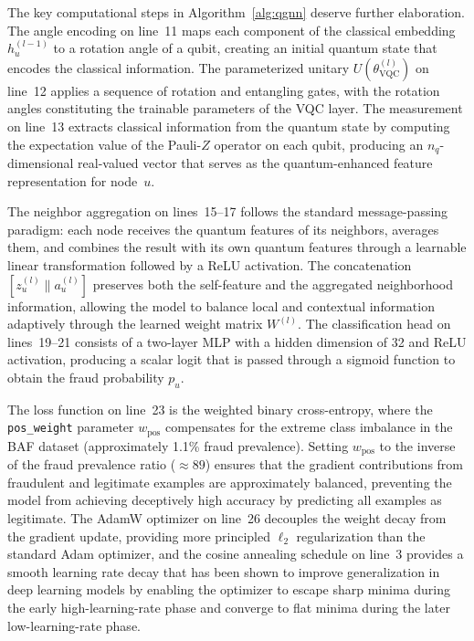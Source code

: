 The key computational steps in Algorithm~\ref{alg:qgnn} deserve further elaboration. The angle encoding on line~11 maps each component of the classical embedding $h_u^{(l-1)}$ to a rotation angle of a qubit, creating an initial quantum state that encodes the classical information. The parameterized unitary $U(\theta_{\text{VQC}}^{(l)})$ on line~12 applies a sequence of rotation and entangling gates, with the rotation angles constituting the trainable parameters of the VQC layer. The measurement on line~13 extracts classical information from the quantum state by computing the expectation value of the Pauli-$Z$ operator on each qubit, producing an $n_q$-dimensional real-valued vector that serves as the quantum-enhanced feature representation for node~$u$.

The neighbor aggregation on lines~15--17 follows the standard message-passing paradigm: each node receives the quantum features of its neighbors, averages them, and combines the result with its own quantum features through a learnable linear transformation followed by a ReLU activation. The concatenation $\left[z_u^{(l)} \| a_u^{(l)}\right]$ preserves both the self-feature and the aggregated neighborhood information, allowing the model to balance local and contextual information adaptively through the learned weight matrix $W^{(l)}$. The classification head on lines~19--21 consists of a two-layer MLP with a hidden dimension of 32 and ReLU activation, producing a scalar logit that is passed through a sigmoid function to obtain the fraud probability $p_u$.

The loss function on line~23 is the weighted binary cross-entropy, where the \texttt{pos\_weight} parameter $w_{\text{pos}}$ compensates for the extreme class imbalance in the BAF dataset (approximately 1.1\% fraud prevalence). Setting $w_{\text{pos}}$ to the inverse of the fraud prevalence ratio ($\approx 89$) ensures that the gradient contributions from fraudulent and legitimate examples are approximately balanced, preventing the model from achieving deceptively high accuracy by predicting all examples as legitimate. The AdamW optimizer on line~26 decouples the weight decay from the gradient update, providing more principled $\ell_2$ regularization than the standard Adam optimizer, and the cosine annealing schedule on line~3 provides a smooth learning rate decay that has been shown to improve generalization in deep learning models by enabling the optimizer to escape sharp minima during the early high-learning-rate phase and converge to flat minima during the later low-learning-rate phase.

